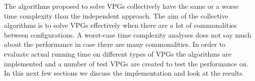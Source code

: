 The algorithms proposed to solve VPGs collectively have the same or a worse time complexity than the independent approach. The aim of the collective algorithms is to solve VPGs effectively when there are a lot of commonalities between configurations. A worst-case time complexity analyses does not say much about the performance in case there are many commonalities. In order to evaluate actual running time on different types of VPGs the algorithms are implemented and a number of test VPGs are created to test the performance on. In this next few sections we discuss the implementation and look at the results.